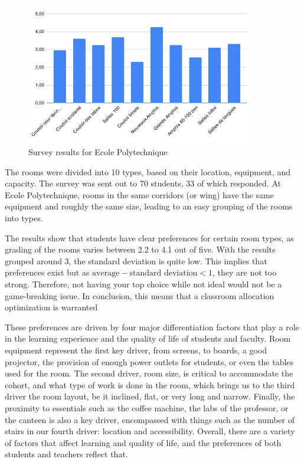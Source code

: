 \documentclass[a4paper, oneside]{article}
\theoremstyle{plain}
\begin{document}
\begin{minipage}{0.6\textwidth}
	\begin{figure}[H]
		\includegraphics[width=0.9\textwidth]{images/survey_result.png}
		\caption{Survey results for Ecole Polytechnique}
	\end{figure}
\end{minipage}
\begin{minipage}{0.4\textwidth}
	The rooms were divided into 10 types, based on their location, equipment, and capacity. The survey was sent out to 70 students, 33 of which responded. At Ecole Polytechnique,
	rooms in the same corridors (or wing) have the same equipment and roughly the same size, leading to an easy grouping of the rooms into types.

	The results show that students have clear preferences for certain room types, as grading of the rooms varies between 2.2 to 4.1 out of five. With the results grouped around 3, the standard deviation is quite low.
	This implies that preferences exist but as $\text{average} - \text{standard deviation} < 1$, they are not too strong. Therefore, not having your top choice while not
	ideal would not be a game-breaking issue. In conclusion, this means that a classroom allocation optimization is warranted\\
\end{minipage}

These preferences are driven by four major differentiation factors that play a role in the learning experience and the quality of life of students and faculty. Room equipment represent the
first key driver, from screens, to boards, a good projector, the provision of enough power outlets for students, or even the tables used for the room. The second driver, room size, is critical
to accommodate the cohort, and what type of work is done in the room, which brings us to the third driver the room layout, be it inclined, flat, or very long and narrow. Finally, the proximity to
essentials such as the coffee machine, the labs of the professor, or the canteen is also a key driver, encompassed with things such as the number of stairs in our fourth driver: location and accessibility.
Overall, there are a variety of factors that affect learning and quality of life, and the preferences of both students and teachers reflect that.
\end{document}
